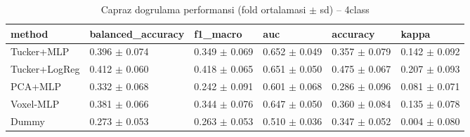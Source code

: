 \begin{table}[htbp]
  \centering
  \caption{Capraz dogrulama performansi (fold ortalamasi $\pm$ sd) -- 4class}
  \label{tab:main_4class}
  \small
  \begin{tabular}{llllll}
    \toprule
    method & balanced\_accuracy & f1\_macro & auc & accuracy & kappa \\
    \midrule
    Tucker+MLP & 0.396 $\pm$ 0.074 & 0.349 $\pm$ 0.069 & 0.652 $\pm$ 0.049 & 0.357 $\pm$ 0.079 & 0.142 $\pm$ 0.092 \\
    Tucker+LogReg & 0.412 $\pm$ 0.060 & 0.418 $\pm$ 0.065 & 0.651 $\pm$ 0.050 & 0.475 $\pm$ 0.067 & 0.207 $\pm$ 0.093 \\
    PCA+MLP & 0.332 $\pm$ 0.068 & 0.242 $\pm$ 0.091 & 0.601 $\pm$ 0.068 & 0.286 $\pm$ 0.096 & 0.081 $\pm$ 0.071 \\
    Voxel-MLP & 0.381 $\pm$ 0.066 & 0.344 $\pm$ 0.076 & 0.647 $\pm$ 0.050 & 0.360 $\pm$ 0.084 & 0.135 $\pm$ 0.078 \\
    Dummy & 0.273 $\pm$ 0.053 & 0.263 $\pm$ 0.053 & 0.510 $\pm$ 0.036 & 0.347 $\pm$ 0.052 & 0.004 $\pm$ 0.080 \\
    \bottomrule
  \end{tabular}
\end{table}
